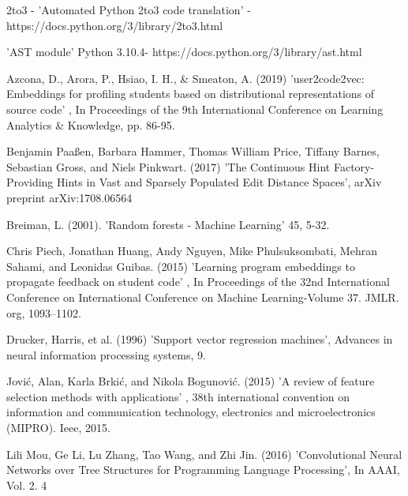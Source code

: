 \documentclass[a4paper, 14pt, oneside]{Thesis}
\begin{document}
\begin{spacing}{1.5}





\end{spacing}
\newpage
\appendix
% 
%
%
\begin{thebibliography}{99}
  
  
 2to3 - 'Automated Python 2to3 code translation' - https://docs.python.org/3/library/2to3.html 

 'AST module' Python 3.10.4- https://docs.python.org/3/library/ast.html
  
 Azcona, D., Arora, P., Hsiao, I. H., \& Smeaton, A. (2019) 'user2code2vec: Embeddings for profiling students based on distributional representations of source code' , In Proceedings of the 9th International Conference on Learning Analytics \& Knowledge, pp. 86-95.

 Benjamin Paaßen, Barbara Hammer, Thomas William Price, Tiffany Barnes, Sebastian Gross, and Niels Pinkwart. (2017) 'The Continuous Hint Factory-Providing Hints in Vast and Sparsely Populated Edit Distance Spaces', arXiv preprint arXiv:1708.06564

 Breiman, L. (2001). 'Random forests - Machine Learning' 45, 5-32.

 Chris Piech, Jonathan Huang, Andy Nguyen, Mike Phulsuksombati, Mehran Sahami, and Leonidas Guibas. (2015) 'Learning program embeddings to propagate feedback on student code' , In Proceedings of the 32nd International Conference on International Conference on Machine Learning-Volume 37. JMLR. org, 1093–1102.

 Drucker, Harris, et al. (1996) 'Support vector regression machines', Advances in neural information processing systems, 9.

 Jović, Alan, Karla Brkić, and Nikola Bogunović. (2015) 'A review of feature selection methods with applications' , 38th international convention on information and communication technology, electronics and microelectronics (MIPRO). Ieee, 2015.

 Lili Mou, Ge Li, Lu Zhang, Tao Wang, and Zhi Jin. (2016)  'Convolutional Neural Networks over Tree Structures for Programming Language Processing', In AAAI, Vol. 2. 4


\end{thebibliography}
\end{document}

